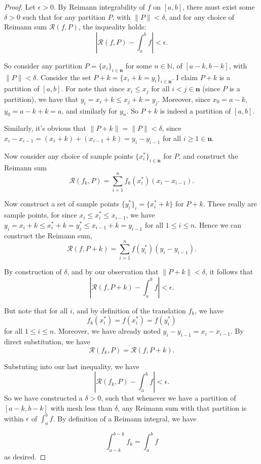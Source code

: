 \documentclass[12pt, letterpaper]{article}
\newcommand{\N}{\mathbb{N}}
\newcommand\norm[1]{\lVert#1\rVert} %
\newcommand\rsum[2]{\mathcal{R} (#1,#2)} %
\theoremstyle{definition}
\begin{document}
    \begin{proof}
        Let $\epsilon > 0$. By Reimann integrability of $f$ on $[a,b]$, there must exist some $\delta > 0$ such that for any partition $P$, with $ \norm{P} < \delta $, and for any choice of Reimann sum $\rsum{f}{P}$, the inqueality holds:
        \[\left|\rsum{f}{P} - \int_{a}^{b} f\right| < \epsilon.\]

        So consider any partition $P = \{x_i\}_{i \in \mathbf{n}}$ for some $n\in \N$, of $[a-k,b-k]$, with $\norm{P} < \delta$. Consider the set $P+k = \{x_i + k = y_i\}_{i \in \mathbf{n}}$. I claim $P+k$ is a partition of $[a,b]$. For note that since $x_i\le x_{j}$ for all $i < j \in \mathbf{n}$ (since $P$ is a partition), we have that $y_i = x_i + k \le x_j + k = y_j$. Moreover, since $x_0 = a-k$, $y_0 = a - k + k = a$, and similarly for $y_n$. So $P+k$ is indeed a partition of $[a,b]$. 

        Similarly, it's obvious that $\norm{P+k} = \norm{P} < \delta$, since $x_i - x_{i-1} = (x_i + k) + (x_{i-1} + k) = y_i - y_{i - 1}$ for all $i \ge 1\in \mathbf{n}$. 

        Now consider any choice of sample points $\{x_i^*\}_{i\in \mathbf{n}}$ for $ P $, and construct the Reimann sum
        \[
            \rsum{f_k}{P} = \sum_{i = 1}^n f_k(x_i^*)(x_i - x_{i-1}). 
            \]

        Now construct a set of sample points $\{y_i^*\}_i = \{x_i^* + k\}$ for $P + k$. These really are sample points, for since $x_i\le x_i^* \le x_{i-1}$, we have
        $ y_i = x_i + k \le x_i^* + k = y_i^* \le x_{i-1} + k = y_{i-1}$ for all $1 \le i \le n$. Hence we can construct the Reimann sum, 
        \[\rsum{f}{P+k} = \sum_{i = 1}^n f(y_i^*)(y_i - y_{i - 1}).\] 

        By construction of $\delta$, and by our observation that $ \norm{P + k} < \delta $, it follows that
        \[\left|\rsum{f}{P + k} - \int_{a}^{b} f\right| < \epsilon.\]

        But note that for all $i$, and by definition of the translation $f_k$, we have 
        \[
            f_k(x_i^*) = f(x_i^*) = f(y_i^*)
            \]
        for all $ 1\le i \le n $. Moreover, we have already noted $y_i - y_{i -1} = x_i - x_{i -1}$. By direct substitution, we have
        \[
            \rsum{f_k}{P} = \rsum{f}{P+k}. 
            \]

        Substuting into our last inequality, we have
        \[
            \left| \rsum{f_k}{P} - \int_{a}^{b} f \right| < \epsilon.
            \]
        So we have constructed a $\delta > 0$, such that whenever we have a partition of $[a-k, b-k]$ with mesh less than $\delta$, any Reimann sum with that partition is within $\epsilon$ of $\int_{a}^{b} f $. By definition of a Reimann integral, we have

        \[
            \int_{a-k}^{b-k}f_k = \int_{a}^{b}f
            \]
            as desired.
    \end{proof}
\end{document}
